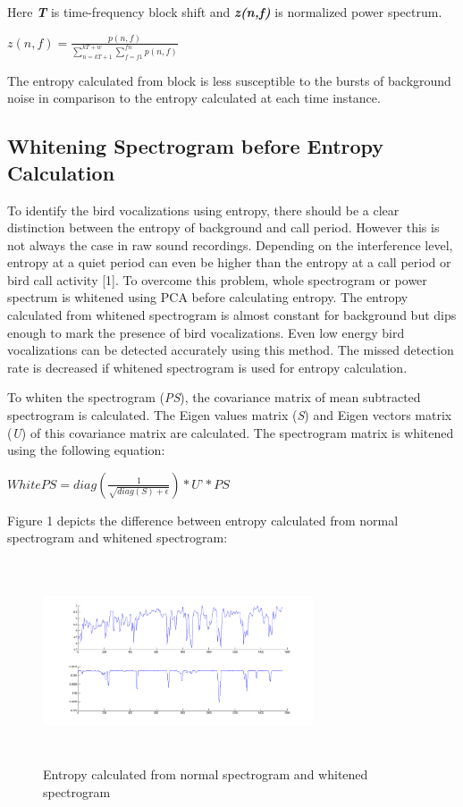 \documentclass[a4paper]{article}
\begin{document}
Here \textbf{\textit{T}} is time-frequency block shift and \textbf{\textit{z(n,f)}} is normalized power spectrum.


\hspace{1cm}

$z(n,f)=\frac {p(n,f)}
{\sum_{n=kT+1}^{kT+w}\sum_{f=f1}^{fn} p(n,f)}$

\hspace{1cm}


The entropy calculated from block is less susceptible to the bursts of background noise in comparison to the entropy calculated at each time instance. 


\subsection{Whitening Spectrogram before Entropy Calculation}

To identify the bird vocalizations using entropy, there should be a clear distinction between the entropy of background and call period. However this is not always the case in raw sound recordings. Depending on the interference level, entropy at a quiet period can even be higher than the entropy at a call period or bird call activity [1]. To overcome this problem, whole spectrogram or power spectrum is whitened using PCA  before calculating entropy. The entropy calculated from whitened spectrogram is almost constant for background but dips enough to mark the presence of bird vocalizations. Even low energy bird vocalizations can be detected accurately using this method. The missed detection rate is decreased if whitened spectrogram is used for entropy calculation. 

To whiten the spectrogram (\textit{PS}), the covariance matrix of mean subtracted spectrogram is calculated. The Eigen values matrix (\textit{S}) and Eigen vectors matrix (\textit{U}) of this covariance matrix are calculated. The spectrogram matrix is whitened using the following equation:

\hspace{1cm}

$WhitePS=diag(\frac{1}{\sqrt{diag(S)+\epsilon}})*\textit{U'}*\textit{PS}$


\hspace{1cm}


Figure 1 depicts the difference between entropy calculated from normal spectrogram and whitened spectrogram:
\begin{figure}[!ht]
	\centering
	\includegraphics[width=8cm, height=6cm]{entropy}
	\caption{ Entropy calculated from normal spectrogram and whitened spectrogram}   
\end{figure}
\end{document}

